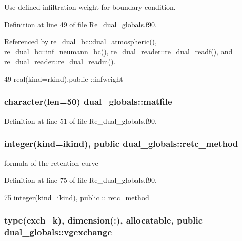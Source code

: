 Use-\/defined infiltration weight for boundary condition. 



Definition at line 49 of file Re\+\_\+dual\+\_\+globals.\+f90.



Referenced by re\+\_\+dual\+\_\+bc\+::dual\+\_\+atmospheric(), re\+\_\+dual\+\_\+bc\+::inf\+\_\+neumann\+\_\+bc(), re\+\_\+dual\+\_\+reader\+::re\+\_\+dual\+\_\+readf(), and re\+\_\+dual\+\_\+reader\+::re\+\_\+dual\+\_\+readm().


\begin{DoxyCode}
49   \textcolor{keywordtype}{real(kind=rkind)},\textcolor{keywordtype}{public} ::infweight
\end{DoxyCode}
\subsubsection[{matfile}]{\setlength{\rightskip}{0pt plus 5cm}character(len=50) dual\+\_\+globals\+::matfile}\label{namespacedual__globals_acbc5f257f0c5b314a04184a600ed0c54}


Definition at line 51 of file Re\+\_\+dual\+\_\+globals.\+f90.

\subsubsection[{retc\+\_\+method}]{\setlength{\rightskip}{0pt plus 5cm}integer(kind=ikind), public dual\+\_\+globals\+::retc\+\_\+method}\label{namespacedual__globals_a460074c4f6e2c7e262bed554a7b59fb6}


formula of the retention curve 



Definition at line 75 of file Re\+\_\+dual\+\_\+globals.\+f90.


\begin{DoxyCode}
75   \textcolor{keywordtype}{integer(kind=ikind)}, \textcolor{keywordtype}{public} :: retc_method
\end{DoxyCode}
\subsubsection[{vgexchange}]{\setlength{\rightskip}{0pt plus 5cm}type({\bf exch\+\_\+k}), dimension(\+:), allocatable, public dual\+\_\+globals\+::vgexchange}\label{namespacedual__globals_ae684f40b743ae05201c926981ec8cecb}



